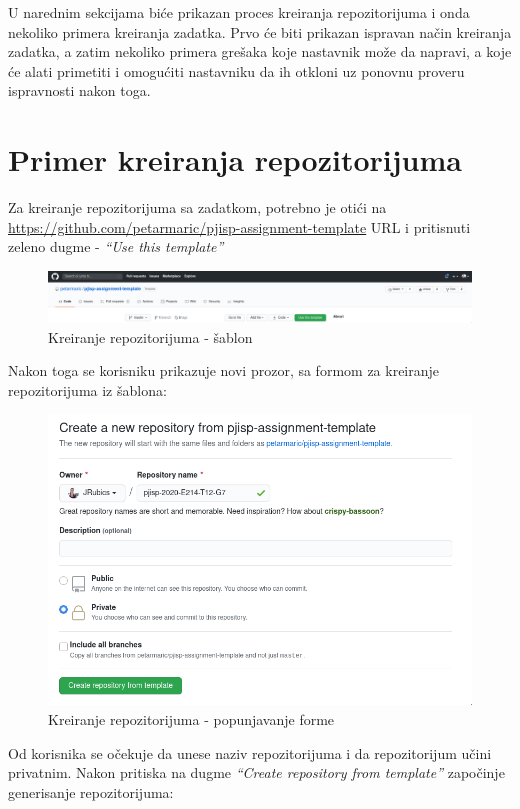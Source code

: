 \documentclass[12pt]{report}
\begin{document}
U narednim sekcijama biće prikazan proces kreiranja repozitorijuma i onda nekoliko primera kreiranja zadatka. Prvo će biti prikazan ispravan način kreiranja zadatka, a zatim nekoliko primera grešaka koje nastavnik može da napravi, a koje će alati primetiti i omogućiti nastavniku da ih otkloni uz ponovnu proveru ispravnosti nakon toga.

\section{Primer kreiranja repozitorijuma}

Za kreiranje repozitorijuma sa zadatkom, potrebno je otići na \url{https://github.com/petarmaric/pjisp-assignment-template} URL i pritisnuti zeleno dugme - \textit{``Use this template''}


\begin{figure}[H]
    \centering
    \includegraphics[width=\linewidth]{images/1.png}
    \caption{Kreiranje repozitorijuma - šablon}
\end{figure}

Nakon toga se korisniku prikazuje novi prozor, sa formom za kreiranje repozitorijuma iz šablona:

\begin{figure}[H]
    \centering
    \includegraphics[width=0.7\linewidth]{images/2.png}
    \caption{Kreiranje repozitorijuma - popunjavanje forme}
\end{figure}

Od korisnika se očekuje da unese naziv repozitorijuma i da repozitorijum učini privatnim. Nakon pritiska na dugme \textit{``Create repository from template''} započinje generisanje repozitorijuma:
\end{document}
